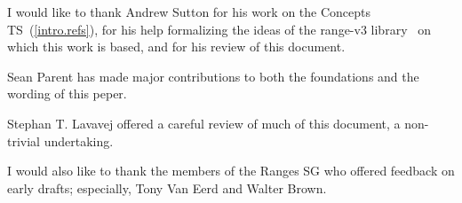 
\pnum
I would like to thank Andrew Sutton for his work on the Concepts TS~(\ref{intro.refs}),
for his help formalizing the ideas of the range-v3 library~\cite{range-v3} on which this
work is based, and for his review of this document.

\pnum
Sean Parent has made major contributions to both the foundations and the wording of this
peper.

\pnum
Stephan T. Lavavej offered a careful review of much of this document, a non-trivial undertaking.

\pnum
I would also like to thank the members of the Ranges SG who offered feedback on early drafts;
especially, Tony Van Eerd and Walter Brown.
